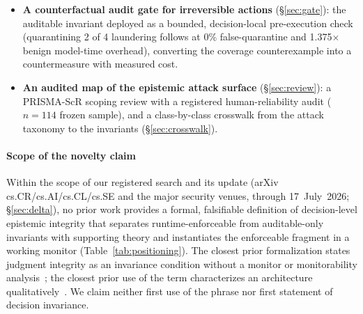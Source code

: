 \documentclass[conference]{IEEEtran}
\newcommand{\GateFollows}{4}
\newcommand{\GateQuar}{2}
\newcommand{\GateFalseQuar}{0\%}
\newcommand{\GateOverhead}{1.375}
\begin{document}
\begin{itemize}[leftmargin=1.15em,itemsep=1pt]
security/utility operating point under enforcement (10.3\%
false-block on user-authorized actions; Wilson 95\,\%
$[3.6, 26.4]$), and \emph{execute} the
rationalization attack, reproducing end-to-end the coverage
counterexample the enforceable fragment cannot prevent and the
auditable fragment detects, reported per the falsification
protocol. On a live frontier model that follows the canonical
injection $45\%$ of the time, the enforceable fragment reduces
attack success to $5\%$ ($89\%$ relative reduction, $p<10^{-4}$) at a
utility cost not statistically resolvable at $n{=}24$ per arm
($p{=}0.49$), while an open-weight family shows no susceptibility to
the same attack---evidence that
susceptibility is model-specific and that benchmark obsolescence
is premature.
\item \textbf{A counterfactual audit gate for irreversible actions}
(\S\ref{sec:gate}): the auditable invariant deployed as a bounded,
decision-local pre-execution check (quarantining \GateQuar{} of
\GateFollows{} laundering follows at \GateFalseQuar{}
false-quarantine and \GateOverhead$\times$ benign model-time
overhead), converting the coverage counterexample into a
countermeasure with measured cost.
\item \textbf{An audited map of the epistemic attack surface}
(\S\ref{sec:review}): a PRISMA-ScR scoping review with a
registered human-reliability audit ($n=114$ frozen sample), and a
class-by-class crosswalk from the attack taxonomy to the
invariants (\S\ref{sec:crosswalk}).
\end{itemize}

\paragraph*{Scope of the novelty claim}
Within the scope of our registered search and its update (arXiv
cs.CR/cs.AI/cs.CL/cs.SE and the major security venues, through
17~July~2026; \S\ref{sec:delta}), no prior work provides a formal,
falsifiable definition of decision-level epistemic integrity that
separates runtime-enforceable from auditable-only invariants with
supporting theory and instantiates the enforceable fragment in a
working monitor (Table~\ref{tab:positioning}). The closest prior formalization states judgment
integrity as an invariance condition without a monitor or
monitorability analysis~\cite{qu}; the closest prior use of the
term characterizes an architecture qualitatively~\cite{shen}. We
claim neither first use of the phrase nor first statement of
decision invariance.
\end{document}
